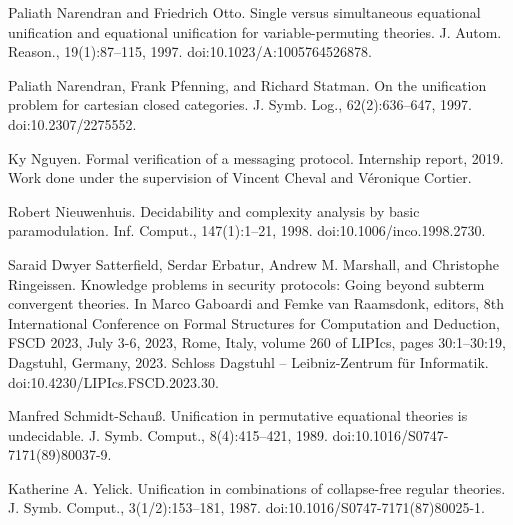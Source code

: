 \par\noindent  [21]  Paliath Narendran and Friedrich Otto.  Single versus simultaneous equational unification and equational unification for variable-permuting theories.  J. Autom. Reason., 19(1):87–115, 1997.  doi:10.1023/A:1005764526878.  
 
\par\noindent  [22]  Paliath Narendran, Frank Pfenning, and Richard Statman.  On the unification problem for cartesian closed categories.  J. Symb. Log., 62(2):636–647, 1997.  doi:10.2307/2275552.  
 
\par\noindent  [23]  Ky Nguyen.  Formal verification of a messaging protocol.  Internship report, 2019.  Work done under the supervision of Vincent Cheval and Véronique Cortier.  
 
\par\noindent  [24]  Robert Nieuwenhuis.  Decidability and complexity analysis by basic paramodulation.  Inf. Comput., 147(1):1–21, 1998.  doi:10.1006/inco.1998.2730.  
 
\par\noindent  [25]  Saraid Dwyer Satterfield, Serdar Erbatur, Andrew M. Marshall, and Christophe Ringeissen.  Knowledge problems in security protocols: Going beyond subterm convergent theories.  In Marco Gaboardi and Femke van Raamsdonk, editors, 8th International Conference on Formal Structures for Computation and Deduction, FSCD 2023, July 3-6, 2023, Rome, Italy, volume 260 of LIPIcs, pages 30:1–30:19, Dagstuhl, Germany, 2023. Schloss Dagstuhl – Leibniz-Zentrum für Informatik.  doi:10.4230/LIPIcs.FSCD.2023.30.  
 
\par\noindent  [26]  Manfred Schmidt-Schauß.  Unification in permutative equational theories is undecidable.  J. Symb. Comput., 8(4):415–421, 1989.  doi:10.1016/S0747-7171(89)80037-9.  
 
\par\noindent  [27]  Katherine A. Yelick.  Unification in combinations of collapse-free regular theories.  J. Symb. Comput., 3(1/2):153–181, 1987.  doi:10.1016/S0747-7171(87)80025-1.  
  
